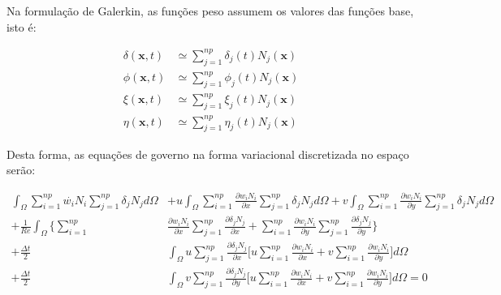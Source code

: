 \medskip
\noindent
Na formulação de Galerkin, as funções peso assumem
os valores das funções base, isto é:

\begin{align}
 \delta(\textbf{x},t) & \simeq \sum\limits_{j=1}^{np} \delta_j(t) N_j(\textbf{x}) \\
 \phi(\textbf{x},t) & \simeq \sum\limits_{j=1}^{np} \phi_j(t) N_j(\textbf{x}) \\
 \xi(\textbf{x},t) & \simeq \sum\limits_{j=1}^{np} \xi_j(t) N_j(\textbf{x}) \\
 \eta(\textbf{x},t) & \simeq \sum\limits_{j=1}^{np} \eta_j(t) N_j(\textbf{x})
\end{align}

\noindent
Desta forma, as equações de governo na forma 
variacional discretizada no espaço serão:

\begin{equation} \label{convection vorticity}
 \begin{aligned} 
  \int_{\Omega} \sum\limits_{i=1}^{np} \overset{.}{w_i} N_i 
                \sum\limits_{j=1}^{np} \delta_j N_j d\Omega 
  & + u \int_{\Omega} \sum\limits_{i=1}^{np} \frac{\partial w_i N_i}{\partial x} 
                    \sum\limits_{j=1}^{np} \delta_j N_j d\Omega 
  + v \int_{\Omega} \sum\limits_{i=1}^{np} \frac{\partial w_i N_i}{\partial y} 
                    \sum\limits_{j=1}^{np} \delta_j N_j d\Omega 
  \\[5pt]
  + \frac{1}{\textit{Re}} \int_{\Omega} \Bigg\{ 
                    \sum\limits_{i=1}^{np} & \frac{\partial w_i N_i}{\partial x} 
                    \sum\limits_{j=1}^{np} \frac{\partial \delta_j N_j}{\partial x} 
  +                 \sum\limits_{i=1}^{np} \frac{\partial w_i N_i}{\partial y} 
                    \sum\limits_{j=1}^{np} \frac{\partial \delta_j N_j}{\partial y} \Bigg\}
 \\[5pt]
 + \frac{\Delta t}{2} & \int_{\Omega} u \sum\limits_{j=1}^{np} \frac{\partial \delta_j N_j}{\partial x}
 \Bigg[
   u \sum\limits_{i=1}^{np} \frac{\partial w_i N_i}{\partial x}
 + v \sum\limits_{i=1}^{np} \frac{\partial w_i N_i}{\partial y}
 \Bigg] d\Omega
 \\[5pt] 
 + \frac{\Delta t}{2} & \int_{\Omega} v \sum\limits_{j=1}^{np} \frac{\partial \delta_j N_j}{\partial y}
 \Bigg[
   u \sum\limits_{i=1}^{np} \frac{\partial w_i N_i}{\partial x}
 + v \sum\limits_{i=1}^{np} \frac{\partial w_i N_i}{\partial y}
 \Bigg] d\Omega = 0
 \end{aligned}
\end{equation}

